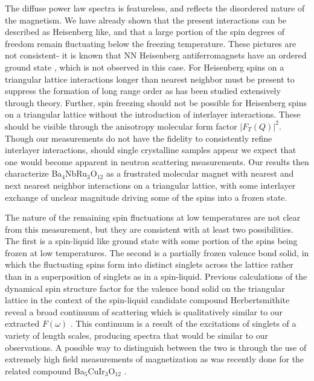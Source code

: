 \documentclass[%
 reprint,
superscriptaddress,
 amsmath,amssymb,
 aps,
 prb,
]{revtex4-2}
\begin{document}
The diffuse power law spectra is featureless, and reflects the disordered nature of the magnetism. We have already shown that the present interactions can be described as Heisenberg like, and that a large portion of the spin degrees of freedom remain fluctuating below the freezing temperature. These pictures are not consistent- it is known that NN Heisenberg antiferromagnets have an ordered ground state \cite{Capriotti1999Long-rangeModel,White2007NeelModels}, which is not observed in this case. For Heisenberg spins on a triangular lattice interactions longer than nearest neighbor must be present to suppress the formation of long range order as has been studied extensively through theory\cite{Zhu2015SpinLattice,Iqbal2016SpinAntiferromagnet}. Further, spin freezing should not be possible for Heisenberg spins on a triangular lattice without the introduction of interlayer interactions. These should be visible through the anisotropy molecular form factor $|F_{T}(Q)|^2$. Though our measurements do not have the fidelity to consistently refine interlayer interactions, should single crystalline samples appear we expect that one would become apparent in neutron scattering measurements. Our results then characterize Ba$_4$NbRu$_3$O$_{12}$ as a frustrated molecular magnet with nearest and next nearest neighbor interactions on a triangular lattice, with some interlayer exchange of unclear magnitude driving some of the spins into a frozen state. 

The nature of the remaining spin fluctuations at low temperatures are not clear from this measurement, but they are consistent with at least two possibilities. The first is a spin-liquid like ground state with some portion of the spins being frozen at low temperatures. The second is a partially frozen valence bond solid, in which the fluctuating spins form into distinct singlets across the lattice rather than in a superposition of singlets as in a spin-liquid. Previous calculations of the dynamical spin structure factor for the valence bond solid on the triangular lattice in the context of the spin-liquid candidate compound Herbertsmithite reveal a broad continuum of scattering which is qualitatively similar to our extracted $F(\omega)$ \cite{Shimokawa2015StaticLattices}. This continuum is a result of the excitations of singlets of a variety of length scales, producing spectra that would be similar to our observations. A possible way to distinguish between the two is through the use of extremely high field measurements of magnetization as was recently done for the related compound Ba$_5$CuIr$_3$O$_{12}$ \cite{Volkov2020RandomCrystals}.
\end{document}
